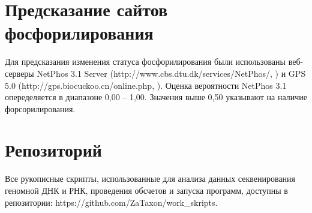 \section{Предсказание сайтов фосфорилирования}

Для предсказания изменения статуса фосфорилирования были использованы веб-серверы NetPhos 3.1 Server (http://www.cbs.dtu.dk/services/NetPhos/, \cite{Blom2004}) и GPS 5.0 (http://gps.biocuckoo.cn/online.php, \cite{Xue2011}). Оценка вероятности NetPhos 3.1 опеределяется в диапазоне 0,00 -- 1,00. Значения выше 0,50 указывают на наличие форсорилирования. 

\section{Репозиторий}

Все рукописные скрипты, использованные для анализа данных секвенирования геномной ДНК и РНК, проведения обсчетов и запуска программ, доступны в репозитории:  https://github.com/ZaTaxon/work\_skripts.